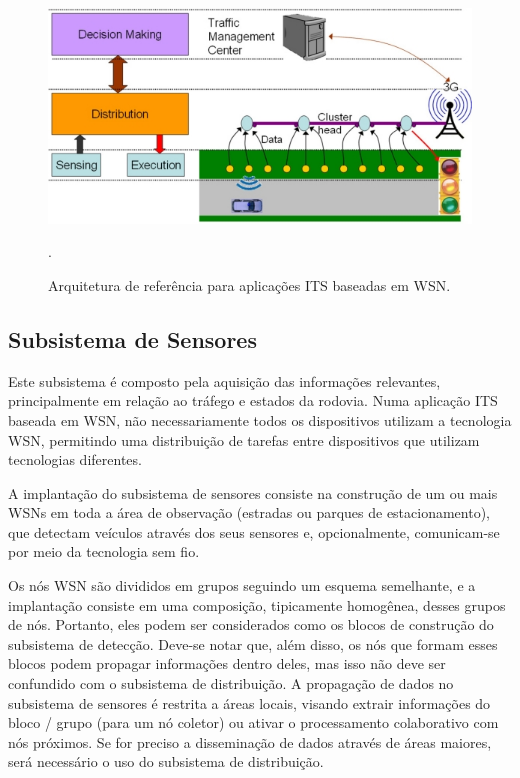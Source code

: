 \documentclass[
	12pt,				%
	oneside,			%
	a4paper,			%
	english,			%
	brazil				%
	]{abntex2ppgsi}
\begin{document}
\begin{figure}[h!]
	\centering
	\includegraphics[width=0.8\columnwidth]{images/camadas_wsn.jpg}
	\caption{Arquitetura de referência para aplicações ITS baseadas em WSN. \cite{losilla2011comprehensive}}.
	\label{fig:arquiteturas_its_wsn}
\end{figure}

\subsection{Subsistema de Sensores}

Este subsistema é composto pela aquisição das informações relevantes, principalmente em relação ao tráfego e estados da rodovia. Numa aplicação ITS baseada em WSN, não necessariamente todos os dispositivos utilizam a tecnologia WSN, permitindo uma distribuição de tarefas entre dispositivos que utilizam tecnologias diferentes. 

A implantação do subsistema de sensores consiste na construção de um ou mais WSNs em toda a área de observação (estradas ou parques de estacionamento), que detectam veículos através dos seus sensores e, opcionalmente, comunicam-se por meio da tecnologia sem fio. 

Os nós WSN são divididos em grupos seguindo um esquema semelhante, e a implantação consiste em uma composição, tipicamente homogênea, desses grupos de nós. Portanto, eles podem ser considerados como os blocos de construção do subsistema de detecção. Deve-se notar que, além disso, os nós que formam esses blocos podem propagar informações dentro deles, mas isso não deve ser confundido com o subsistema de distribuição. A propagação de dados no subsistema de sensores é restrita a áreas locais, visando extrair informações do bloco / grupo (para um nó coletor) ou ativar o processamento colaborativo com nós próximos. Se for preciso a disseminação de dados através de áreas maiores, será necessário o uso do subsistema de distribuição.
\end{document}

